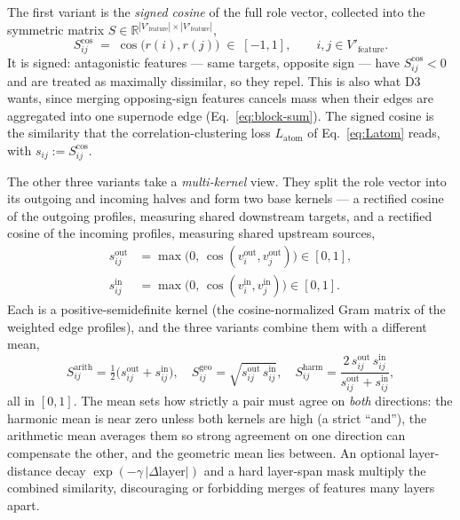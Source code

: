 \documentclass[../main.tex]{subfiles}
\begin{document}
The first variant is the \emph{signed cosine} of the full role vector, collected into
the symmetric matrix
$S \in \mathbb{R}^{|V'_{\text{feature}}| \times |V'_{\text{feature}}|}$,
\begin{equation}
S^{\cos}_{ij} \;=\; \cos\bigl(r(i), r(j)\bigr) \;\in\; [-1, 1],
\qquad i, j \in V'_{\text{feature}}.
\label{eq:sim}
\end{equation}
It is signed: antagonistic features --- same targets, opposite sign --- have
$S^{\cos}_{ij} < 0$ and are treated as maximally dissimilar, so they repel. This is
also what D3 wants, since merging opposing-sign features cancels mass when their
edges are aggregated into one supernode edge (Eq.~\eqref{eq:block-sum}). The signed
cosine is the similarity that the correlation-clustering loss $L_{\text{atom}}$ of
Eq.~\eqref{eq:Latom} reads, with $s_{ij} := S^{\cos}_{ij}$.

The other three variants take a \emph{multi-kernel} view. They split the role vector
into its outgoing and incoming halves and form two base kernels --- a rectified
cosine of the outgoing profiles, measuring shared downstream targets, and a rectified
cosine of the incoming profiles, measuring shared upstream sources,
\begin{align}
s^{\text{out}}_{ij} &= \max\!\bigl(0,\, \cos(v_i^{\text{out}}, v_j^{\text{out}})\bigr) \in [0, 1], \label{eq:sout}\\
s^{\text{in}}_{ij}  &= \max\!\bigl(0,\, \cos(v_i^{\text{in}},  v_j^{\text{in}})\bigr)  \in [0, 1]. \label{eq:sin}
\end{align}
Each is a positive-semidefinite kernel (the cosine-normalized Gram matrix of the
weighted edge profiles), and the three variants combine them with a different mean,
\begin{equation}
S^{\text{arith}}_{ij} = \tfrac{1}{2}\bigl(s^{\text{out}}_{ij} + s^{\text{in}}_{ij}\bigr),
\quad
S^{\text{geo}}_{ij} = \sqrt{s^{\text{out}}_{ij}\, s^{\text{in}}_{ij}},
\quad
S^{\text{harm}}_{ij} = \frac{2\, s^{\text{out}}_{ij}\, s^{\text{in}}_{ij}}{s^{\text{out}}_{ij} + s^{\text{in}}_{ij}},
\label{eq:sim-mk}
\end{equation}
all in $[0, 1]$. The mean sets how strictly a pair must agree on \emph{both}
directions: the harmonic mean is near zero unless both kernels are high (a strict
``and''), the arithmetic mean averages them so strong agreement on one direction can
compensate the other, and the geometric mean lies between. An optional
layer-distance decay $\exp(-\gamma\,|\Delta\text{layer}|)$ and a hard layer-span mask
multiply the combined similarity, discouraging or forbidding merges of features many
layers apart.
\end{document}
